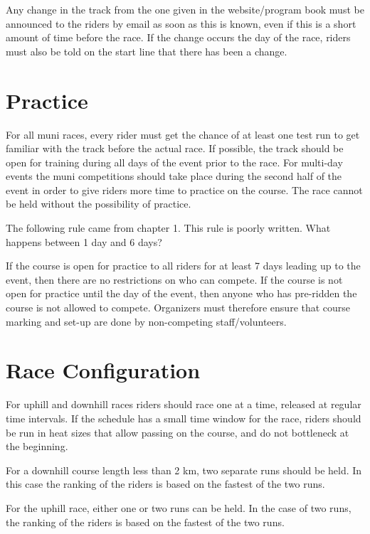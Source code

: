 Any change in the track from the one given in the website/program book must be announced to the riders by email as soon as this is known, even if this is a short amount of time before the race.
If the change occurs the day of the race, riders must also be told on the start line that there has been a change.

\section{Practice}

For all muni races, every rider must get the chance of at least one test run to get familiar with the track before the actual race.
If possible, the track should be open for training during all days of the event prior to the race.
For multi-day events the muni competitions should take place during the second half of the event in order to give riders more time to practice on the course.
The race cannot be held without the possibility of practice.

\begin{comment2016}
The following rule came from chapter 1.
This rule is poorly written.
What happens between 1 day and 6 days?
\end{comment2016}

If the course is open for practice to all riders for at least 7 days leading up to the event, then there are no restrictions on who can compete.
If the course is not open for practice until the day of the event, then anyone who has pre-ridden the course is not allowed to compete.
Organizers must therefore ensure that course marking and set-up are done by non-competing staff/volunteers.

\section{Race Configuration}

For uphill and downhill races riders should race one at a time, released at regular time intervals.
If the schedule has a small time window for the race, riders should be run in heat sizes that allow passing on the course, and do not bottleneck at the beginning.

For a downhill course length less than 2 km, two separate runs should be held.
In this case the ranking of the riders is based on the fastest of the two runs.

For the uphill race, either one or two runs can be held.
In the case of two runs, the ranking of the riders is based on the fastest of the two runs.

